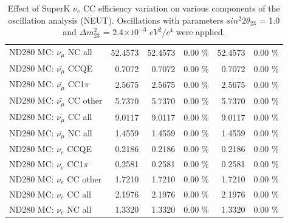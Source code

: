 \begin{table}
\begin{tabular}{| l | r | r  r | r  r |}
                                          ND280 MC: $\nu_{\mu}$ NC all &         52.4573 &         52.4573 &  0.00 \%  &         52.4573 &  0.00 \%  \\ 
                                      ND280 MC: $\bar{\nu_{\mu}}$ CCQE &          0.7072 &          0.7072 &  0.00 \%  &          0.7072 &  0.00 \%  \\ 
                                  ND280 MC: $\bar{\nu_{\mu}}$ CC1$\pi$ &          2.5675 &          2.5675 &  0.00 \%  &          2.5675 &  0.00 \%  \\ 
                                  ND280 MC: $\bar{\nu_{\mu}}$ CC other &          5.7370 &          5.7370 &  0.00 \%  &          5.7370 &  0.00 \%  \\ 
                                    ND280 MC: $\bar{\nu_{\mu}}$ CC all &          9.0117 &          9.0117 &  0.00 \%  &          9.0117 &  0.00 \%  \\ 
                                    ND280 MC: $\bar{\nu_{\mu}}$ NC all &          1.4559 &          1.4559 &  0.00 \%  &          1.4559 &  0.00 \%  \\ 
                                              ND280 MC: $\nu_{e}$ CCQE &          0.2186 &          0.2186 &  0.00 \%  &          0.2186 &  0.00 \%  \\ 
                                          ND280 MC: $\nu_{e}$ CC1$\pi$ &          0.2581 &          0.2581 &  0.00 \%  &          0.2581 &  0.00 \%  \\ 
                                          ND280 MC: $\nu_{e}$ CC other &          1.7210 &          1.7210 &  0.00 \%  &          1.7210 &  0.00 \%  \\ 
                                            ND280 MC: $\nu_{e}$ CC all &          2.1976 &          2.1976 &  0.00 \%  &          2.1976 &  0.00 \%  \\ 
                                            ND280 MC: $\nu_{e}$ NC all &          1.3320 &          1.3320 &  0.00 \%  &          1.3320 &  0.00 \%  \\ 
\hline
\end{tabular}
\caption{ 
  Effect of SuperK $\nu_{e}$ CC efficiency variation
  on various components of the oscillation analysis (NEUT).
  Oscillations with parameters $sin^{2}2\theta_{23}$ = 1.0 and $\Delta m^{2}_{23}$ = 2.4$\times10^{-3}$ $eV^{2}/c^{4}$ were applied.  
}
\label{tab:neut_sk_nuecc_eff}
\end{table}


%
%
%
%

